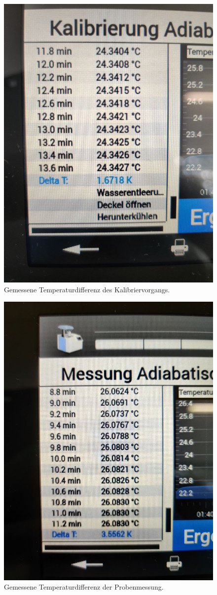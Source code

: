 	\begin{figure}[h]
		\centering
		\includegraphics[width=.8\textwidth]{assets/photos/kaloriemeter_kalib5.jpg}
		\caption[Gemessene Temperaturdifferenz des Kalibriervorgangs]{Gemessene Temperaturdifferenz des Kalibriervorgangs.}
		\label{fig:gemessene temperaturdifferenz des kalibriervorgangs}
	\end{figure}
	\begin{figure}[h]
		\centering
		\includegraphics[width=.8\textwidth]{assets/photos/kaloriemeter_messung3.jpg}
		\caption[Gemessene Temperaturdifferenz der Probenmessung]{Gemessene Temperaturdifferenz der Probenmessung.}
		\label{fig:gemessene temperaturdifferenz der probenmessung}
	\end{figure}